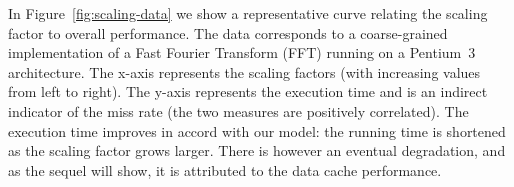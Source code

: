 In Figure~\ref{fig:scaling-data} we show a
representative curve relating the scaling factor to overall
performance. The data corresponds to a coarse-grained implementation of 
a Fast Fourier Transform (FFT) running on a Pentium~3 architecture. The
x-axis represents the scaling factors (with increasing values from
left to right). The y-axis represents the execution time and is an
indirect indicator of the miss rate (the two measures are positively
correlated). The execution time improves in accord with our model: 
the running time is shortened as the scaling factor grows larger. There
is however an eventual degradation, and as the sequel will show, it is 
attributed to the data cache performance.
